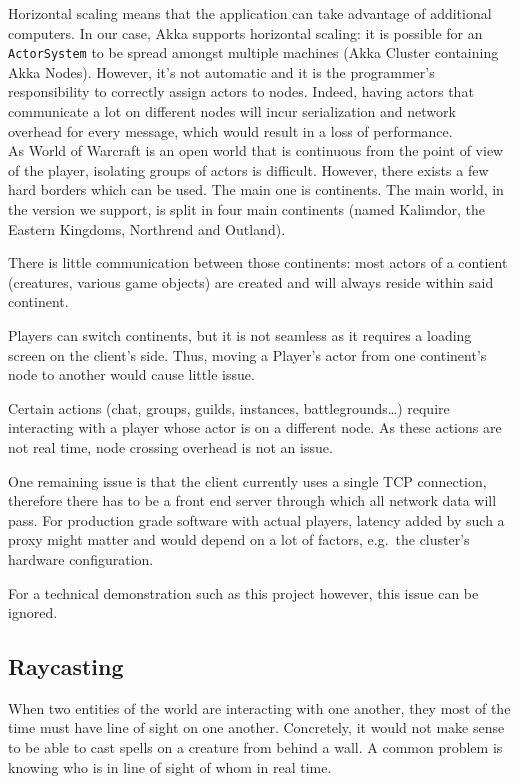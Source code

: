 \documentclass[paper=a4, fontsize=11pt]{scrartcl}
\begin{document}
Horizontal scaling means that the application can take advantage of additional
computers.
In our case, Akka supports horizontal scaling: it is possible for an
\texttt{ActorSystem} to be spread amongst multiple machines (Akka Cluster
containing Akka Nodes).
However, it's not automatic and it is the programmer's responsibility to
correctly assign actors to nodes.
Indeed, having actors that communicate a lot on different nodes will incur
serialization and network overhead for every message, which would result in a
loss of performance.\\

As World of Warcraft is an open world that is continuous from the point of view
of the player, isolating groups of actors is difficult.
However, there exists a few hard borders which can be used.
The main one is continents. The main world, in the version we support, is split
in four main continents (named Kalimdor, the Eastern Kingdoms, Northrend and
Outland).

There is little communication between those continents: most actors of a
contient (creatures, various game objects) are created and will always reside
within said continent.

Players can switch continents, but it is not seamless as it requires a loading
screen on the client's side.
Thus, moving a Player's actor from one continent's node to another would
cause little issue.

Certain actions (chat, groups, guilds, instances, battlegrounds\ldots) 
require interacting with a player whose actor is on a different node.
As these actions are not real time, node crossing overhead is not an issue.

One remaining issue is that the client currently uses a single TCP connection,
therefore there has to be a front end server through which all network data
will pass.
For production grade software with actual players, latency added by such a proxy
might matter and would depend on a lot of factors, e.g.\ the cluster's hardware
configuration.

For a technical demonstration such as this project however, this issue can be
ignored.

\subsection{Raycasting}

When two entities of the world are interacting with one another, they most of
the time must have line of sight on one another.
Concretely, it would not make sense to be able to cast spells on a creature from
behind a wall.
A common problem is knowing who is in line of sight of whom in real time.
\end{document}

